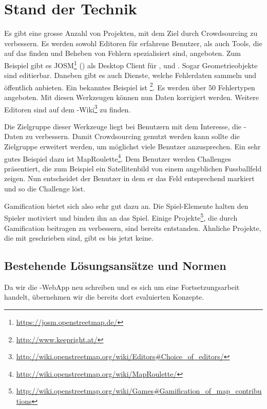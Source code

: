 \chapter{Stand der Technik}
\label{tb-stand-der-technik}
Es gibt eine grosse Anzahl von Projekten, mit dem Ziel  durch \gls{Crowdsourcing} zu verbessern.
Es werden sowohl Editoren für erfahrene Benutzer, als auch Tools, die auf das finden und Beheben von Fehlern spezialisiert sind, angeboten.
Zum Beispiel gibt es JOSM\footnote{\url{https://josm.openstreetmap.de/}} () als Desktop Client für ,  und .
Sogar Geometrieobjekte sind editierbar.
Daneben gibt es auch Dienste, welche Fehlerdaten sammeln und öffentlich anbieten.
Ein bekanntes Beispiel ist \footnote{\url{http://www.keepright.at/}}.
Es werden über 50 Fehlertypen angeboten.
Mit diesen Werkzeugen können nun Daten korrigiert werden.
Weitere Editoren sind auf dem -Wiki\footnote{\url{http://wiki.openstreetmap.org/wiki/Editors\#Choice_of_editors/}} zu finden.

Die Zielgruppe dieser Werkzeuge liegt bei Benutzern mit dem Interesse, die -Daten zu verbessern.
Damit \gls{Crowdsourcing} genutzt werden kann sollte die Zielgruppe erweitert werden, um möglichst viele Benutzer anzusprechen.
Ein sehr gutes Beispiel dazu ist MapRoulette\footnote{\url{http://wiki.openstreetmap.org/wiki/MapRoulette/}}.
Dem Benutzer werden Challenges präsentiert, die zum Beispiel ein Satellitenbild von einem angeblichen Fussballfeld zeigen. 
Nun entscheidet der Benutzer in dem er das Feld entsprechend markiert und so die Challenge löst.

\gls{Gamification} bietet sich also sehr gut dazu an.
Die Spiel-Elemente halten den Spieler motiviert und binden ihn an das Spiel.
Einige Projekte\footnote{\url{http://wiki.openstreetmap.org/wiki/Games\#Gamification_of_map_contributions}}, die durch \gls{Gamification} beitragen  zu verbessern, sind bereits entstanden.
Ähnliche Projekte, die mit  geschrieben sind, gibt es bis jetzt keine.


\section{Bestehende Lösungsansätze und Normen}
Da wir die \kort{}-\gls{WebApp} neu schreiben und es sich um eine Fortsetzungsarbeit handelt, übernehmen wir die bereits dort evaluierten Konzepte.


